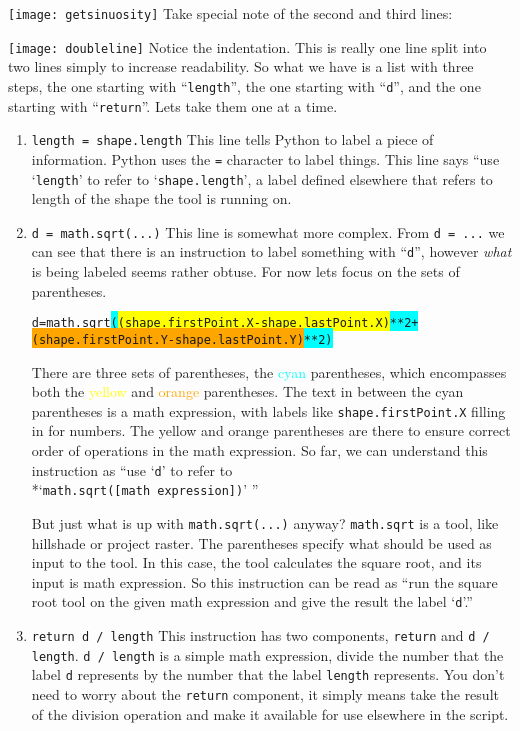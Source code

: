 \documentclass{article}
\begin{document}
\noindent
\texttt{[image: getsinuosity]}
Take special note of the second and third lines:

\noindent
\texttt{[image: doubleline]}
Notice the indentation.  This is really one line split into two lines simply to increase readability.  So what we have is a list with three steps, the one starting with ``\verb+length+'', the one starting with ``\verb+d+'', and the one starting with ``\verb+return+''.  Lets take them one at a time.
\begin{enumerate}
    \item \verb+length = shape.length+
        This line tells Python to label a piece of information.  Python uses the \verb+=+ character to label things.  This line says ``use `\verb+length+' to refer to `\verb+shape.length+', a label defined elsewhere that refers to length of the shape the tool is running on.  
    \item \verb+d = math.sqrt(...)+
        This line is somewhat more complex.  From \verb+d = ...+ we can see that there is an instruction to label something with ``\verb+d+'', however \textit{what} is being labeled seems rather obtuse.  For now lets focus on the sets of parentheses.  
        \begin{alltt}
d = math.sqrt\colorbox{cyan}{(\colorbox{yellow}{(shape.firstPoint.X - shape.lastPoint.X)} ** 2 +}
              \colorbox{cyan}{\colorbox{orange}{(shape.firstPoint.Y - shape.lastPoint.Y)} ** 2)}
\end{alltt}
There are three sets of parentheses, the \textcolor{cyan}{cyan} parentheses, which encompasses both the \textcolor{yellow}{yellow} and \textcolor{orange}{orange} parentheses.  The text in between the cyan parentheses is a math expression, with labels like \verb+shape.firstPoint.X+ filling in for numbers.  The yellow and orange parentheses are there to ensure correct order of operations in the math expression.  
So far, we can understand this instruction as ``use `\verb+d+' to refer to \\*`\verb+math.sqrt([math expression])+' ''

But just what is up with \verb+math.sqrt(...)+ anyway?  \verb+math.sqrt+ is a tool, like hillshade or project raster.  The parentheses specify what should be used as input to the tool.  In this case, the tool calculates the square root, and its input is math expression.  So this instruction can be read as ``run the square root tool on the given math expression and give the result the label `\verb+d+'.''
    \item \verb+return d / length+
        This instruction has two components, \verb+return+ and \verb+d / length+.  \verb+d / length+ is a simple math expression, divide the number that the label \verb+d+ represents by the number that the label \verb+length+ represents.  You don't need to worry about the \verb+return+ component, it simply means take the result of the division operation and make it available for use elsewhere in the script.
\end{enumerate}
\end{document}
